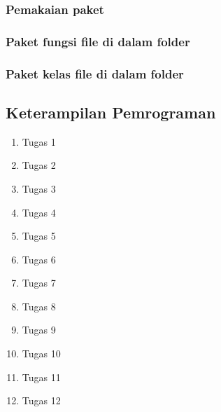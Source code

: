 \subsubsection{Pemakaian paket}

\subsubsection{Paket fungsi file di dalam folder}

\subsubsection{Paket kelas file di dalam folder}

\subsection{Keterampilan Pemrograman}
\begin{enumerate}
	\item Tugas 1
	
	\begin{figure}
		
		\caption{}
	\end{figure}
	\item Tugas 2
	
	\item Tugas 3
	
	\item Tugas 4
	
	\item Tugas 5
	
	\item Tugas 6
	
	\item Tugas 7
	
	\item Tugas 8
	
	\item Tugas 9
	
	\item Tugas 10
	
	\item Tugas 11
	
	\item Tugas 12
	
\end{enumerate}
